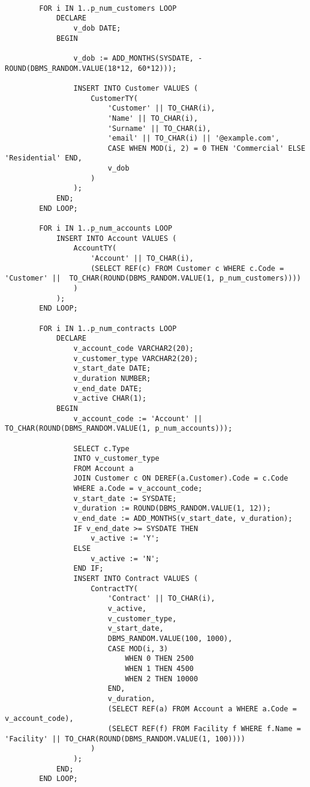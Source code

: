 \begin{lstlisting}
        
        
        
    
        FOR i IN 1..p_num_customers LOOP
            DECLARE
                v_dob DATE;
            BEGIN
               
                v_dob := ADD_MONTHS(SYSDATE, -ROUND(DBMS_RANDOM.VALUE(18*12, 60*12)));
    
                INSERT INTO Customer VALUES (
                    CustomerTY(
                        'Customer' || TO_CHAR(i),
                        'Name' || TO_CHAR(i),
                        'Surname' || TO_CHAR(i),
                        'email' || TO_CHAR(i) || '@example.com',
                        CASE WHEN MOD(i, 2) = 0 THEN 'Commercial' ELSE 'Residential' END,
                        v_dob
                    )
                );
            END;
        END LOOP;
    
        FOR i IN 1..p_num_accounts LOOP
            INSERT INTO Account VALUES (
                AccountTY(
                    'Account' || TO_CHAR(i),
                    (SELECT REF(c) FROM Customer c WHERE c.Code = 'Customer' ||  TO_CHAR(ROUND(DBMS_RANDOM.VALUE(1, p_num_customers))))
                )
            );
        END LOOP;
    
        FOR i IN 1..p_num_contracts LOOP
            DECLARE
                v_account_code VARCHAR2(20);
                v_customer_type VARCHAR2(20);
                v_start_date DATE;
                v_duration NUMBER;
                v_end_date DATE;
                v_active CHAR(1);
            BEGIN
                v_account_code := 'Account' || TO_CHAR(ROUND(DBMS_RANDOM.VALUE(1, p_num_accounts)));
    
                SELECT c.Type 
                INTO v_customer_type
                FROM Account a
                JOIN Customer c ON DEREF(a.Customer).Code = c.Code
                WHERE a.Code = v_account_code;
                v_start_date := SYSDATE;
                v_duration := ROUND(DBMS_RANDOM.VALUE(1, 12));
                v_end_date := ADD_MONTHS(v_start_date, v_duration);
                IF v_end_date >= SYSDATE THEN
                    v_active := 'Y';
                ELSE
                    v_active := 'N';
                END IF;
                INSERT INTO Contract VALUES (
                    ContractTY(
                        'Contract' || TO_CHAR(i),
                        v_active,  
                        v_customer_type, 
                        v_start_date,
                        DBMS_RANDOM.VALUE(100, 1000),
                        CASE MOD(i, 3)
                            WHEN 0 THEN 2500
                            WHEN 1 THEN 4500
                            WHEN 2 THEN 10000
                        END,
                        v_duration, 
                        (SELECT REF(a) FROM Account a WHERE a.Code = v_account_code),
                        (SELECT REF(f) FROM Facility f WHERE f.Name = 'Facility' || TO_CHAR(ROUND(DBMS_RANDOM.VALUE(1, 100))))
                    )
                );
            END;
        END LOOP;
    

\end{lstlisting}
